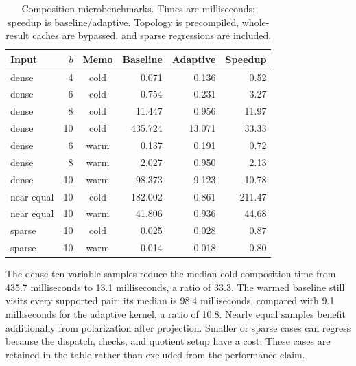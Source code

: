 \documentclass[11pt]{article}
\theoremstyle{definition}\newtheorem{definition}[theorem]{Definition}
\theoremstyle{remark}\newtheorem{remark}[theorem]{Remark}
\begin{document}
\begin{table}[htbp]
\centering\small
\begin{tabular}{lrcrrr}
\toprule
Input & $b$ & Memo & Baseline & Adaptive & Speedup \\
\midrule
dense & 4 & cold & 0.071 & 0.136 & 0.52 \\
dense & 6 & cold & 0.754 & 0.231 & 3.27 \\
dense & 8 & cold & 11.447 & 0.956 & 11.97 \\
dense & 10 & cold & 435.724 & 13.071 & 33.33 \\
dense & 6 & warm & 0.137 & 0.191 & 0.72 \\
dense & 8 & warm & 2.027 & 0.950 & 2.13 \\
dense & 10 & warm & 98.373 & 9.123 & 10.78 \\
near equal & 10 & cold & 182.002 & 0.861 & 211.47 \\
near equal & 10 & warm & 41.806 & 0.936 & 44.68 \\
sparse & 10 & cold & 0.025 & 0.028 & 0.87 \\
sparse & 10 & warm & 0.014 & 0.018 & 0.80 \\
\bottomrule
\end{tabular}
\caption{Composition microbenchmarks. Times are milliseconds; speedup is baseline/adaptive. Topology is precompiled, whole-result caches are bypassed, and sparse regressions are included.}
\label{tab:micro}
\end{table}

The dense ten-variable samples reduce the median cold composition time from 435.7 milliseconds to 13.1 milliseconds, a ratio of 33.3. The warmed baseline still visits every supported pair: its median is 98.4 milliseconds, compared with 9.1 milliseconds for the adaptive kernel, a ratio of 10.8. Nearly equal samples benefit additionally from polarization after projection. Smaller or sparse cases can regress because the dispatch, checks, and quotient setup have a cost. These cases are retained in the table rather than excluded from the performance claim.
\end{document}
